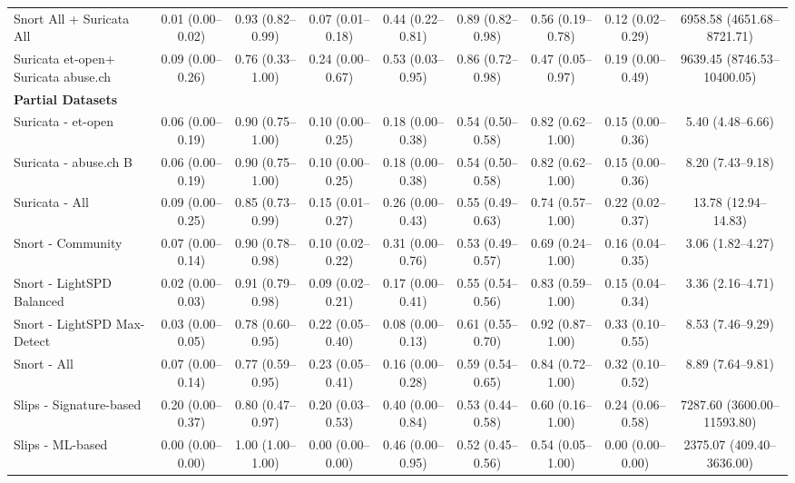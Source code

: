 \begin{table}[t]
{\begin{tabular}{lcccccccc}
        Snort All + Suricata All & 0.01 (0.00–0.02) & 0.93 (0.82–0.99) & 0.07 (0.01–0.18) & 0.44 (0.22–0.81) & 0.89 (0.82–0.98) & 0.56 (0.19–0.78) & 0.12 (0.02–0.29) & 6958.58 (4651.68–8721.71) \\
        Suricata et-open+ Suricata abuse.ch & 0.09 (0.00–0.26) & 0.76 (0.33–1.00) & 0.24 (0.00–0.67) & 0.53 (0.03–0.95) & 0.86 (0.72–0.98) & 0.47 (0.05–0.97) & 0.19 (0.00–0.49) & 9639.45 (8746.53–10400.05) \\
        \midrule
        \multicolumn{9}{l}{\textbf{Partial Datasets}} \\
        Suricata - et-open & 0.06 (0.00–0.19) & 0.90 (0.75–1.00) & 0.10 (0.00–0.25) & 0.18 (0.00–0.38) & 0.54 (0.50–0.58) & 0.82 (0.62–1.00) & 0.15 (0.00–0.36) & 5.40 (4.48–6.66) \\
        Suricata - abuse.ch B & 0.06 (0.00–0.19) & 0.90 (0.75–1.00) & 0.10 (0.00–0.25) & 0.18 (0.00–0.38) & 0.54 (0.50–0.58) & 0.82 (0.62–1.00) & 0.15 (0.00–0.36) & 8.20 (7.43–9.18) \\
        Suricata - All & 0.09 (0.00–0.25) & 0.85 (0.73–0.99) & 0.15 (0.01–0.27) & 0.26 (0.00–0.43) & 0.55 (0.49–0.63) & 0.74 (0.57–1.00) & 0.22 (0.02–0.37) & 13.78 (12.94–14.83) \\
        Snort - Community & 0.07 (0.00–0.14) & 0.90 (0.78–0.98) & 0.10 (0.02–0.22) & 0.31 (0.00–0.76) & 0.53 (0.49–0.57) & 0.69 (0.24–1.00) & 0.16 (0.04–0.35) & 3.06 (1.82–4.27) \\
        Snort - LightSPD Balanced & 0.02 (0.00–0.03) & 0.91 (0.79–0.98) & 0.09 (0.02–0.21) & 0.17 (0.00–0.41) & 0.55 (0.54–0.56) & 0.83 (0.59–1.00) & 0.15 (0.04–0.34) & 3.36 (2.16–4.71) \\
        Snort - LightSPD Max-Detect & 0.03 (0.00–0.05) & 0.78 (0.60–0.95) & 0.22 (0.05–0.40) & 0.08 (0.00–0.13) & 0.61 (0.55–0.70) & 0.92 (0.87–1.00) & 0.33 (0.10–0.55) & 8.53 (7.46–9.29) \\
        Snort - All & 0.07 (0.00–0.14) & 0.77 (0.59–0.95) & 0.23 (0.05–0.41) & 0.16 (0.00–0.28) & 0.59 (0.54–0.65) & 0.84 (0.72–1.00) & 0.32 (0.10–0.52) & 8.89 (7.64–9.81) \\
        Slips - Signature-based & 0.20 (0.00–0.37) & 0.80 (0.47–0.97) & 0.20 (0.03–0.53) & 0.40 (0.00–0.84) & 0.53 (0.44–0.58) & 0.60 (0.16–1.00) & 0.24 (0.06–0.58) & 7287.60 (3600.00–11593.80) \\
        Slips - ML-based & 0.00 (0.00–0.00) & 1.00 (1.00–1.00) & 0.00 (0.00–0.00) & 0.46 (0.00–0.95) & 0.52 (0.45–0.56) & 0.54 (0.05–1.00) & 0.00 (0.00–0.00) & 2375.07 (409.40–3636.00) \\

\end{tabular}}
\end{table}
